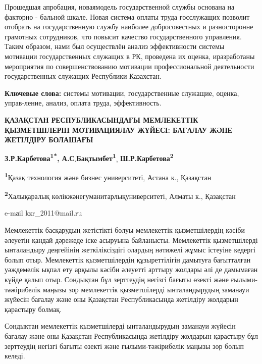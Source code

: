 Прошедшая апробация, новаямодель государственной службы основана на
факторно - бальной шкале. Новая система оплаты труда госслужащих
позволит отобрать на государственную службу наиболее добросовестных и
разносторонне грамотных сотрудников, что повысит качество
государственного управления. Таким образом, нами был осуществлён анализ
эффективности системы мотивации государственных служащих в РК, проведена
их оценка, иразработаны мероприятия по совершенствованию мотивации
профессиональной деятельности государственных служащих Республики
Казахстан.

\hspace{1.5em} {\bfseries Ключевые слова:} системы мотивации, государственные служащие,
оценка, управ-ление, анализ, оплата труда, эффективность.

\begin{center}
{\large\bfseries ҚАЗАҚСТАН РЕСПУБЛИКАСЫНДАҒЫ МЕМЛЕКЕТТІК
ҚЫЗМЕТШІЛЕРІН МОТИВАЦИЯЛАУ ЖҮЙЕСІ: БАҒАЛАУ ЖӘНЕ ЖЕТІЛДІРУ
БОЛАШАҒЫ}

\vspace{1em}

{\bfseries З.Р.Карбетова\textsuperscript{1*},
А.С}.{\bfseries Бақтымбет\textsuperscript{1}},
{\bfseries Ш.Р.Карбетова\textsuperscript{2}}

{\bfseries \textsuperscript{1}}Қазақ технология және бизнес университеті,
Астана к., Қазақстан

{\bfseries \textsuperscript{2}}Халықаралық
көлікжәнегуманитарлықуниверситеті, Алматы к., Қазақстан

e-mаil kzr\_2011@mail.ru
\end{center}

\hspace{1.5em} Мемлекеттік басқарудың жетістікті болуы мемлекеттік қызметшілердің
кәсіби әлеуетін қандай дәрежеде іске асыруына байланысты. Мемлекеттік
қызметшілерді ынталандыру деңгейінің жеткіліксіздігі олардың нәтижелі
жұмыс істеуіне кедергі болып отыр. Мемлекеттік қызметшілердің
құзыреттілігін дамытуға бағытталған уәждемелік ықпал ету арқылы кәсіби
әлеуетті арттыру жолдары әлі де дамымаған күйде қалып отыр. Сондықтан
бұл зерттеудің негізгі бағыты өзекті және ғылыми-тәжірибелік маңызы зор
мемлекеттік қызметшілерді ынталандырудың заманауи жүйесін бағалау және
оны Қазақстан Республикасында жетілдіру жолдарын қарастыру болмақ.

Сондықтан мемлекеттік қызметшілерді ынталандырудың заманауи жүйесін
бағалау және оны Қазақстан Республикасында жетілдіру жолдарын қарастыру
бұл зерттеудің негізгі бағыты өзекті және ғылыми-тәжірибелік маңызы зор
болып келеді.

